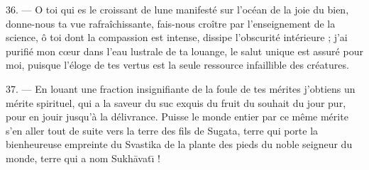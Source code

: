 \documentclass[a4paper, 11pt, oneside, french, landscape, twocolumn]{article}
\begin{document}
36. --- O toi qui es le croissant de lune manifesté sur l'océan de la joie du bien, donne-nous ta vue rafraîchissante, fais-nous croître par l'enseignement de la science, ô toi dont la compassion est intense, dissipe l'obscurité intérieure ; j'ai purifié mon cœur dans l'eau lustrale de ta louange, le salut unique est assuré pour moi, puisque l'éloge de tes vertus est la seule ressource infaillible des créatures.

37. --- En louant une fraction insignifiante de la foule de tes mérites j'obtiens un mérite spirituel, qui a la saveur du suc exquis du fruit du souhait du jour pur, pour en jouir jusqu'à la délivrance. Puisse le monde entier par ce même mérite s'en aller tout de suite vers la terre des fils de Sugata, terre qui porte la bienheureuse empreinte du Svastika de la plante des pieds du noble seigneur du monde, terre qui a nom Sukh\={a}vat\={\i} !
\clearpage
\end{document}
